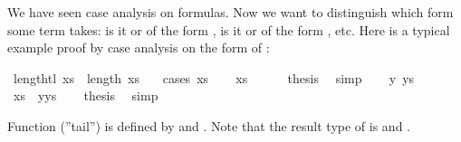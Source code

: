 \begin{isabellebody}
\begin{isamarkuptext}
We have seen case analysis on formulas. Now we want to distinguish
which form some term takes: is it  or of the form ,
is it  or of the form , etc. Here is a typical example
proof by case analysis on the form of :%
\end{isamarkuptext}%
\isamarkuptrue%
\isamarkupfalse%
\ {}length{}tl\ xs{}\ {}\ length\ xs\ {}\ {}{}\isanewline
%
\isadelimproof
%
\endisadelimproof
%
\isatagproof
{}\isamarkupfalse%
\ {}cases\ xs{}\isanewline
\ \ \isamarkupfalse%
\ {}xs\ {}\ {}{}{}\isanewline
\ \ \isamarkupfalse%
\ {}thesis\ \isamarkupfalse%
\ simp\isanewline
{}\isamarkupfalse%
\isanewline
\ \ \isamarkupfalse%
\ y\ ys\ \isamarkupfalse%
\ {}xs\ {}\ y{}ys{}\isanewline
\ \ \isamarkupfalse%
\ {}thesis\ \isamarkupfalse%
\ simp\isanewline
{}\isamarkupfalse%
%
\endisatagproof
{\isafoldproof}%
%
\isadelimproof
%
\endisadelimproof
%
\begin{isamarkuptext}%
Function  (''tail'') is defined by  and
. Note that the result type of  is 
and .


\end{isamarkuptext}
\end{isabellebody}
